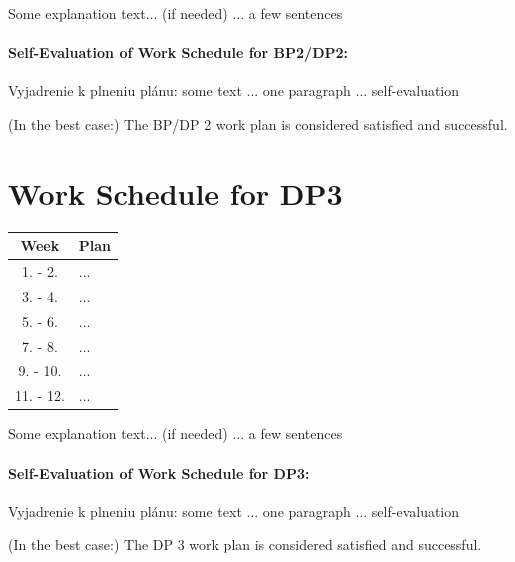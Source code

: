 Some explanation text... (if needed) ... a few sentences

\paragraph{Self-Evaluation of Work Schedule for BP2/DP2:}
Vyjadrenie k plneniu plánu: some text ... one paragraph ... self-evaluation

(In the best case:) The BP/DP 2 work plan is considered satisfied and successful.



\section{Work Schedule for DP3}
\label{sec:Work-Schedule-3rd-semester}

\begin{table}[ht]
    \centering
    \begin{tabular}{c|l}
    \toprule
        Week & Plan \\
    \midrule
        1. - 2.     & ... \\
        3. - 4.     & ... \\
        5. - 6.     & ... \\
        7. - 8.     & ... \\
        9. - 10.    & ... \\
        11. - 12.   & ... \\
    \bottomrule
    \end{tabular}
    \label{tab:dp3}
\end{table}

Some explanation text... (if needed) ... a few sentences

\paragraph{Self-Evaluation of Work Schedule for DP3:}
Vyjadrenie k plneniu plánu: some text ... one paragraph ... self-evaluation

(In the best case:) The DP 3 work plan is considered satisfied and successful.